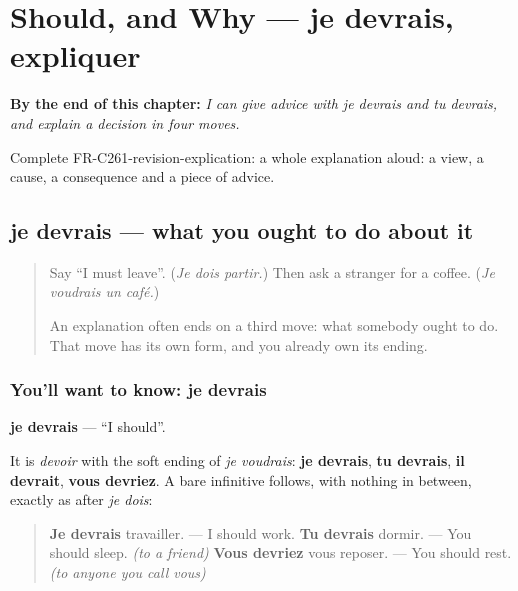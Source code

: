 
\chapter{Should, and Why — je devrais, expliquer}
\label{ch:fr-should-and-why}

\begin{chapteropening}
\textbf{By the end of this chapter:} \emph{I can give advice with je devrais and tu devrais, and explain a decision in four moves.}

Complete FR-C261-revision-explication: a whole explanation aloud: a view, a cause, a consequence and a piece of advice.
\end{chapteropening}

\section[je devrais]{je devrais — what you ought to do about it}

\label{lesson:FR-C261-je-devrais}



\begin{quote}
Say \textquotedblleft{}I must leave\textquotedblright{}. (\emph{Je dois partir.}) Then ask a stranger for a coffee. (\emph{Je voudrais un café.})

An explanation often ends on a third move: what somebody ought to do. That move has its own form, and you already own its ending.
\end{quote}

\subsection*{You'll want to know: je devrais}
\textbf{je devrais} — \textquotedblleft{}I should\textquotedblright{}.

It is \emph{devoir} with the soft ending of \emph{je voudrais}: \textbf{je devrais}, \textbf{tu devrais}, \textbf{il devrait}, \textbf{vous devriez}. A bare infinitive follows, with nothing in between, exactly as after \emph{je dois}:

\begin{quote}
\textbf{Je devrais} travailler. — I should work. \textbf{Tu devrais} dormir. — You should sleep. \emph{(to a friend)} \textbf{Vous devriez} vous reposer. — You should rest. \emph{(to anyone you call vous)}
\end{quote}

